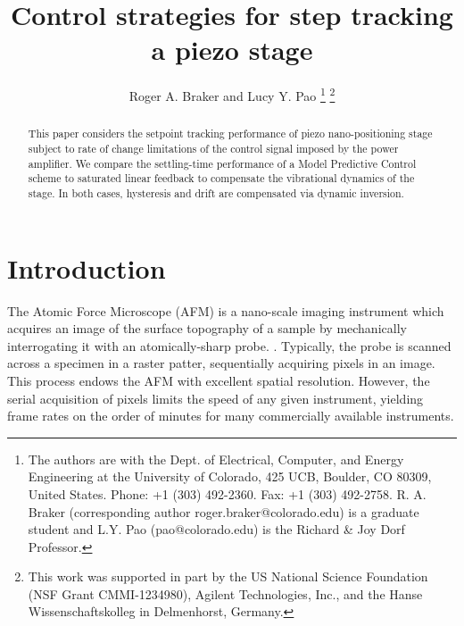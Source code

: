 \documentclass[journal,twocolumn,twoside]{IEEEtran}
\begin{document}
\title{Control strategies for step tracking a piezo stage}
\author{Roger A. Braker and Lucy Y. Pao
  \thanks{The authors are with the Dept. of Electrical, Computer, and Energy Engineering at the University of Colorado, 425 UCB, Boulder, CO 80309, United States. Phone: +1 (303) 492-2360. Fax: +1 (303) 492-2758.
    R. A.  Braker (corresponding author roger.braker@colorado.edu) is a graduate student and
    L.Y. Pao (pao@colorado.edu) is the Richard \& Joy Dorf Professor.}
  \thanks{This work was supported in part by the US National Science Foundation (NSF Grant CMMI-1234980), Agilent Technologies, Inc., and the Hanse Wissenschaftskolleg in Delmenhorst, Germany.}
}

\maketitle
\begin{abstract}
  This paper considers the setpoint tracking performance of piezo nano-positioning stage subject to rate of change limitations of the control signal imposed by the power amplifier. We compare the settling-time performance of a Model Predictive Control scheme to saturated linear feedback to compensate the vibrational dynamics of the stage. In both cases, hysteresis and drift are compensated via dynamic inversion. 
\end{abstract}


\section{Introduction}\label{sec:intro}

The Atomic Force Microscope (AFM) is a nano-scale imaging instrument which acquires an image of the surface topography of a sample by mechanically interrogating it with an atomically-sharp probe.  \cite{abramovitch_tutorial_2007}. Typically, the probe is scanned across a specimen in a raster patter, sequentially acquiring pixels in an image. This process endows the AFM with excellent spatial resolution. However, the serial acquisition of pixels limits the speed of any given instrument, yielding frame rates on the order of minutes for many commercially available instruments.
\end{document}
